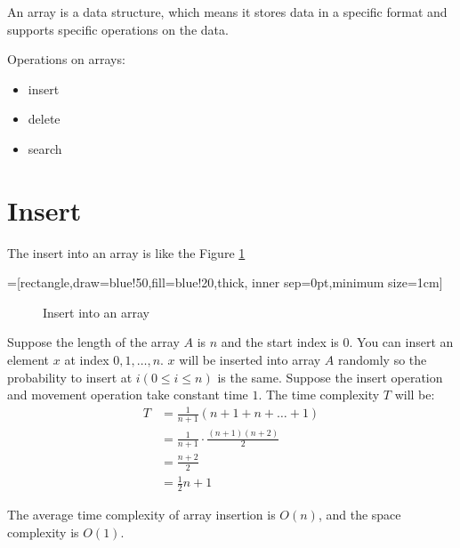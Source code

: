 An array is a data structure, which means it stores data in a specific format and supports specific operations on the data.

Operations on arrays:
\begin{itemize}
\item insert
\item delete
\item search
\end{itemize}



\section{Insert}

The insert into an array is like the Figure \ref{fig:array-insert}


=[rectangle,draw=blue!50,fill=blue!20,thick, inner sep=0pt,minimum size=1cm]
\begin{figure}[!htp]
  \centering

  \caption{Insert into an array}
  \label{fig:array-insert}
\end{figure}

Suppose the length of the array \(A\) is \(n\) and the start index is \(0\).
You can insert an element \(x\) at index \(0, 1, \ldots, n\).
\(x\) will be inserted into array \(A\) randomly so the probability to insert at \(i (0 \le i \le n)\) is the same.
Suppose the insert operation and movement operation take constant time \(1\).
The time complexity \(T\) will be:
\begin{align*}
  \label{eq:1}
  T &= \frac{1}{n+1}(n+1 + n + \ldots + 1)\\
    &= \frac{1}{n+1} \cdot \frac{(n+1)(n+2)}{2}\\
    &= \frac{n+2}{2}\\
    &= \frac{1}{2} n + 1
\end{align*}


The average time complexity of array insertion is $O(n)$, and the space complexity is $O(1)$.


